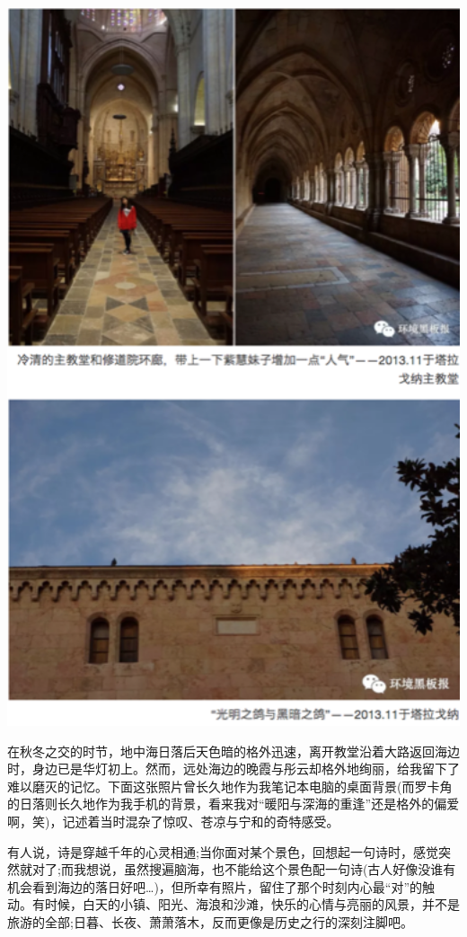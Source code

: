 \documentclass[
]{book}
\begin{document}
\includegraphics[width=5.25in]{images/xt39}

在秋冬之交的时节，地中海日落后天色暗的格外迅速，离开教堂沿着大路返回海边时，身边已是华灯初上。然而，远处海边的晚霞与彤云却格外地绚丽，给我留下了难以磨灭的记忆。下面这张照片曾长久地作为我笔记本电脑的桌面背景(而罗卡角的日落则长久地作为我手机的背景，看来我对``暖阳与深海的重逢''还是格外的偏爱啊，笑)，记述着当时混杂了惊叹、苍凉与宁和的奇特感受。

有人说，诗是穿越千年的心灵相通;当你面对某个景色，回想起一句诗时，感觉突然就对了;而我想说，虽然搜遍脑海，也不能给这个景色配一句诗(古人好像没谁有机会看到海边的落日好吧\ldots)，但所幸有照片，留住了那个时刻内心最``对''的触动。有时候，白天的小镇、阳光、海浪和沙滩，快乐的心情与亮丽的风景，并不是旅游的全部;日暮、长夜、萧萧落木，反而更像是历史之行的深刻注脚吧。
\end{document}
